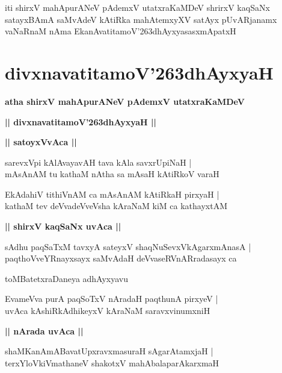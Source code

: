 \documentclass[twoside,12pt,openright]{book}
\def\S{\char'263}
\newcounter{shloka}[chapter]
\def\uvaca#1{\centerline{{\large\textbf{#1}}}}
\begin{document}
\begin{center}
iti shirxV mahApurANeV pAdemxV utatxraKaMDeV shrirxV kaqSaNx satayxBAmA saMvAdeV kAtiRka 
mahAtemxyXV satAyx pUvARjanamx vaNaRnaM nAma EkanAvatitamoV\S dhAyxyasasxmApatxH 
\end{center}

\chapter{divxnavatitamoV\S dhAyxyaH}

\begin{center}
{\LARGE\bfseries atha shirxV mahApurANeV pAdemxV utatxraKaMDeV}
\end{center}

\begin{center}
{\LARGE\bfseries || divxnavatitamoV\S dhAyxyaH || }
\end{center}


\uvaca{|| satoyxVvAca ||}

\begin{shloka}%
sarevxVpi kAlAvayavAH tava kAla savxrUpiNaH |\\
mAsAnAM tu kathaM nAtha sa mAsaH kAtiRkoV varaH 
\end{shloka}

\begin{shloka}%
EkAdahiV tithiVnAM ca mAsAnAM kAtiRkaH pirxyaH |\\
kathaM tev deVvadeVveVsha kAraNaM kiM ca kathayxtAM 
\end{shloka}

\uvaca{|| shirxV kaqSaNx uvAca ||}

\begin{shloka}%
sAdhu paqSaTxM tavxyA sateyxV shaqNuSevxVkAgarxmAnasA |\\
paqthoVveYRnayxsayx saMvAdaH deVvaseRVnARradasayx ca 
\end{shloka}

\begin{center}
toMBatetxraDaneya adhAyxyavu
\end{center}

\begin{shloka}%
EvameVva purA paqSoTxV nAradaH paqthunA pirxyeV |\\
uvAca kAshiRkAdhikeyxV kAraNaM saravxvinumxniH 
\end{shloka}

\uvaca{|| nArada uvAca ||}

\begin{shloka}%
shaMKanAmABavatUpxravxmasuraH sAgarAtamxjaH |\\
terxYloVkiVmathaneV shakotxV mahAbalaparAkarxmaH 
\end{shloka}
\end{document}
